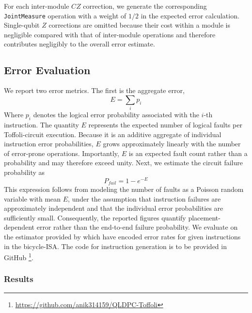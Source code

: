 \documentclass[sigconf]{acmart}
\newcommand{\anik}[1]{%
        \textcolor{blue}{\textbf{Anik:} #1}%
    }
\newcommand{\anik}[1]{}
\begin{document}
For each inter-module $CZ$ correction, we generate the corresponding \texttt{JointMeasure} operation with a weight of $1/2$ in the expected error calculation. Single-qubit $Z$ corrections are omitted because their cost within a module is negligible compared with that of inter-module operations and therefore contributes negligibly to the overall error estimate.

%
\subsection{Error Evaluation}
\label{sub:error_evaluation}


We report two error metrics. The first is the aggregate error, \[E= \sum_i p_i\]
Where $p_i$ denotes the logical error probability associated with the $i$-th instruction. The quantity $E$ represents the expected number of logical faults per Toffoli-circuit execution. Because it is an additive aggregate of individual instruction error probabilities, $E$ grows approximately linearly with the number of error-prone operations. Importantly, $E$ is an expected fault count rather than a probability and may therefore exceed unity. Next, we estimate the circuit failure probability as 
\[P_{fail} = 1 - e^{-E}\]
This expression follows from modeling the number of faults as a Poisson random variable with mean $E$, under the assumption that instruction failures are approximately independent and that the individual error probabilities are sufficiently small. 
Consequently, the reported figures quantify placement-dependent error rather than the end-to-end failure probability. We evaluate on the estimator provided by \cite{tourdegross,bicycle_compiler} which have encoded error rates for given instructions in the bicycle-ISA. The code for instruction generation is to be provided in GitHub \footnote{\url{https://github.com/anik314159/QLDPC-Toffoli}}.

\subsubsection{Results}
\label{subsub:result}
\end{document}
